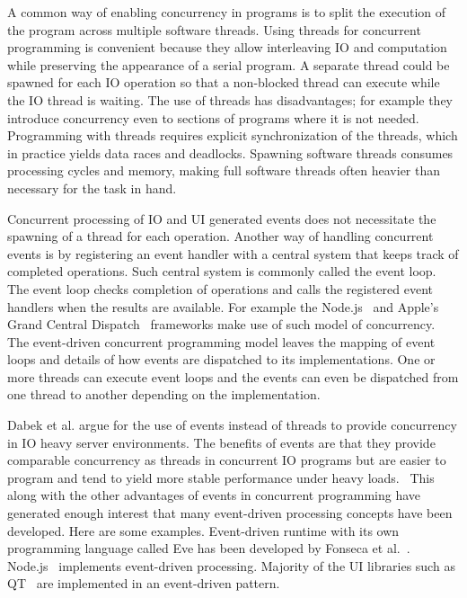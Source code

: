 A common way of enabling concurrency in programs is to split the execution of the program across multiple software threads. Using threads for concurrent programming is convenient because they allow interleaving IO and computation while preserving the appearance of a serial program. A separate thread could be spawned for each IO operation so that a non-blocked thread can execute while the IO thread is waiting. The use of threads has disadvantages; for example they introduce concurrency even to sections of programs where it is not needed. Programming with threads requires explicit synchronization of the threads, which in practice yields data races and deadlocks. Spawning software threads consumes processing cycles and memory, making full software threads often heavier than necessary for the task in hand.~\cite{dabek2002event, lee2006problem}

Concurrent processing of IO and UI generated events does not necessitate the spawning of a thread for each operation. Another way of handling concurrent events is by registering an event handler with a central system that keeps track of completed operations. Such central system is commonly called the event loop. The event loop checks completion of operations and calls the registered event handlers when the results are available. For example the Node.js~\cite{tilkov2010node} and Apple's Grand Central Dispatch~\cite{sakamoto2012grand} frameworks make use of such model of concurrency. The event-driven concurrent programming model leaves the mapping of event loops and details of how events are dispatched to its implementations. One or more threads can execute event loops and the events can even be dispatched from one thread to another depending on the implementation.

Dabek et al. argue for the use of events instead of threads to provide concurrency in IO heavy server environments. The benefits of events are that they provide comparable concurrency as threads in concurrent IO programs but are easier to program and tend to yield more stable performance under heavy loads.~\cite{dabek2002event} This along with the other advantages of events in concurrent programming have generated enough interest that many event-driven processing concepts have been developed. Here are some examples. Event-driven runtime with its own programming language called Eve has been developed by Fonseca et al.~\cite{fonseca2014eve}. Node.js~\cite{tilkov2010node} implements event-driven processing. Majority of the UI libraries such as QT~\cite{blanchette2006cpp} are implemented in an event-driven pattern.
